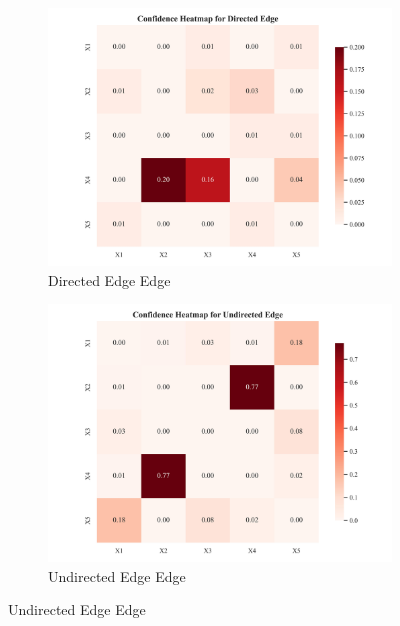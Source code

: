\documentclass{article}
\begin{document}
\begin{figure}[H]
    \centering
    \begin{subfigure}{0.32\textwidth}
        \centering
        \includegraphics[width=\linewidth]{./demo_data/20241104_155051/Linear_Gaussian_data/output_graph/certain_edges_confidence_heatmap.jpg}
        \caption{Directed Edge Edge}
    \end{subfigure}
    \begin{subfigure}{0.32\textwidth}
        \centering
        \includegraphics[width=\linewidth]{./demo_data/20241104_155051/Linear_Gaussian_data/output_graph/uncertain_edges_confidence_heatmap.jpg}
        \caption{Undirected Edge Edge}
    \end{subfigure}

\end{figure}
\end{document}
